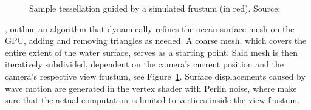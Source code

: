\begin{figure}
{}
\caption{\textcolor{changed}{
Sample tessellation guided by a simulated frustum (in red). Source:~\citet{Centelles:2014}
}}
\label{fig:centelles:mesh}
\end{figure}
%
\textcolor{changed}{\cite{Centelles:2014}, outline an algorithm that 
dynamically refines the ocean surface mesh on the GPU,
adding and removing triangles as needed.
A coarse mesh, which covers the entire extent of the water surface, serves
as a starting point. Said mesh is then iteratively subdivided, dependent
on the camera's current position and the camera's respective view frustum,
see Figure~\ref{fig:centelles:mesh}.
Surface displacements caused by wave motion are generated in the vertex
shader with Perlin noise, where \citeauthor{Centelles:2014} make sure
that the actual computation is limited to vertices inside the view
frustum.
}
%
%
%
